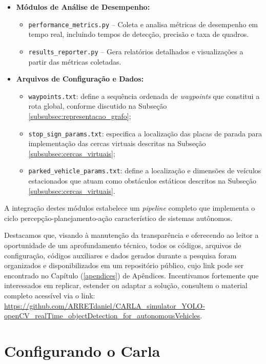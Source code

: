 \begin{itemize}
    \item \textbf{Módulos de Análise de Desempenho:}
    \begin{itemize}
        \item \texttt{performance\_metrics.py} – Coleta e analisa métricas de desempenho em tempo real, incluindo tempos de detecção, precisão e taxa de quadros.
        
        \item \texttt{results\_reporter.py} – Gera relatórios detalhados e visualizações a partir das métricas coletadas.
    \end{itemize}
    
    \item \textbf{Arquivos de Configuração e Dados:}
    \begin{itemize}
        \item \texttt{waypoints.txt}: define a sequência ordenada de \textit{waypoints} que constitui a rota global, conforme discutido na Subseção \ref{subsubsec:representacao_grafo};
        \item \texttt{stop\_sign\_params.txt}: especifica a localização das placas de parada para implementação das cercas virtuais descritas na Subseção \ref{subsubsec:cercas_virtuais};
        \item \texttt{parked\_vehicle\_params.txt}: define a localização e dimensões de veículos estacionados que atuam como obstáculos estáticos descritos na Subseção \ref{subsubsec:cercas_virtuais}.
    \end{itemize}
\end{itemize}

A integração destes módulos estabelece um \textit{pipeline} completo que implementa o ciclo percepção-planejamento-ação característico de sistemas autônomos.

Destacamos que, visando à manutenção da transparência e oferecendo ao leitor a oportunidade de um aprofundamento técnico, todos os códigos, arquivos de configuração, códigos auxiliares e dados gerados durante a pesquisa foram organizados e disponibilizados em um repositório público, cujo link pode ser encontrado no Capítulo (\ref{apendices}) de Apêndices. Incentivamos fortemente que interessados em replicar, estender ou adaptar a solução, consultem o material completo acessível via o link: \url{https://github.com/ARRETdaniel/CARLA_simulator_YOLO-openCV_realTime_objectDetection_for_autonomousVehicles}.

\section{Configurando o Carla}
\label{configuracao_carla}

